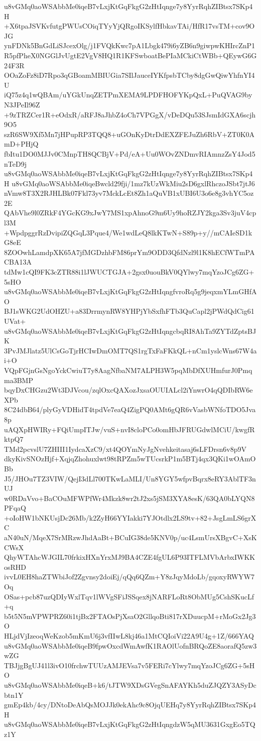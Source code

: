 u8vGMq0aoWSAbbMe0iqeB7vLxjKtGqFkgG2zHtIqnge7y8YyrRqhZIBtsx7SKp4H
+X6tpaJSVKvfutgPWUsCOiqTYyYjQRgoIKSylfHbkavTAi/HfR17vsTM+cov9OJG
ynFDNk5BnGdLiSJcexOlg/j1FVQkKwc7pA1Lbgk479i6yZB6n9giwpwKHIrcZnP1
R5pfPheX0NGGlJvUgtE2VgV8HQ1R1KFSwboatBePIaMCkiCtWBb+QEywG6G24F3R
OOaZoFz8iD7Rpo3qGBoamMBIUGia7SIlJauceIYKfpsbTCby8dgGwQiwYhfnYI4U
iQ75z4q1wQBAm/uYGkUnqZETPmXEMA9LPDFHOFYKpQxL+PuQVAG9byN3JPeIl96Z
+9zTRZCer1R+eOdxR/aRFJ8aJhbZ4oCh7VPGgX/vDeDQu53SJsmIdGXA6scjh9O5
szR6SW9Xf5Mn7jHPupRP3TQQ8+uGOnKyDtrDdEXZFEJuZh6RbV+ZT0K0AmD+PHjQ
fbItu1DO0MJJv0CMnpTH8QCBjV+Pd/eA+Uu0WOvZNDmvRIAmnzZsY4Jod5nTeD9j
u8vGMq0aoWSAbbMe0iqeB7vLxjKtGqFkgG2zHtIqnge7y8YyrRqhZIBtsx7SKp4H
u8vGMq0aoWSAbbMe0iqeBwcld29fji/1mz7kUzWkMiu2sD6gxlRhczoJSbt7jtJ6
nVmw8T3X2RJHLBk07Fkl73yv7MckLcEt8Zh1aQuVB1xUBI6U3o6e8g3vhYC5oz2E
QAbVhe9l0ZRkF4YGcKG9xJwY7MS1xpAhnoG9m6Uy9hoRZJY2kga3Sv3juV4cpl3M
+WpdpggrRzDvipiZQGqL3Pque4/We1wdLeQ8lkKTwN+S89p+y//mCAIeSD1kG8eE
8ZOOwhLamdpXK65A7jfMGDzhbFM86prYm9ODD3QfdNzl9l1K8hECfWTmPACBA13A
tdMw1cQI9FK3cZTR88i1lJWUCTGJA+2gsx0uouBkV0QYlwy7mqYzoJCg6ZG+5sHO
u8vGMq0aoWSAbbMe0iqeB7vLxjKtGqFkgG2zHtIqngfvroRq5g9jeqxmYLmGHfAO
BJ1sWKG2UdOHZU+a83DrrmynRW8YHPjYbSxfhFTb3QuCapl2jPWdQdCig61UVat+
u8vGMq0aoWSAbbMe0iqeB7vLxjKtGqFkgG2zHtIqngcbqRI8AhTa9ZYTdZptsBJK
3PvJMJlatz5UlCsGoTjrHCIwDmOMT7QS1rgTxFaFKkQL+nCm1yslcWns67W4ai+O
VQpFGjnGsNgoYckCwiuT7y8AagNfbaNM7ALPH3W5pqMbDfXUHmfurJ0Pmqma3BMP
bqyDxCHGzu2Wt3DJVcou/zqlOxcQAXozJxsaOUUIALcl2iYnwrO4qQDIbRW6eXPb
8C24dbB64/plyGyVDHidT4tpdVe7eaQ4ZigPQ0AMt6gQR6vVasbWNfoTDO5Jva8p
uAQXpHWIRy+FQiUmpITJw/vuS+nvI8cloPCo0omHbJFRUGdwlMCiU/kwgfRktpQ7
TMd2pcvslU7ZHIII1IydcaXzC9/xt4QOYmNyJgNvehkeitasaj6sLFDrsn6v8p9V
dkyKivSNOzHjf+XqjqZhohuxlwt98tRPZm5wTUcsrkP1m5BTj4qx3QKi1wOAmOBb
J5/JHOu7TZ3VIW/QejI3dLl700TKwLaMLI/Un8YGY5wfpvBqrx8eRY3AblTF3nUJ
w0RDaVvo+BaCOuMFWPfWr4Mkzk8wr2tJ2xs5jSM3XYA8esK/63QA0bLYQN8PFqaQ
+oIoHW1bNKUsjDc26Mb/k2ZyH66YYIakki7YJOtdlx2LS9tv+82+JsgLmLS6grXC
aN40uN/MqeX7SrMRzwJhdAaBt+BCuIG38de5KNV0p/uc4LsmUrsXBgvC+XsKCWsX
QhyWTAhcWJGIL70frkixHXnYrxMJ9BA4CZE4fgUL6P93ITFLMVbArbxIWKKosRHD
ivvL0EH8haZTWbiJof2Zgvnsy2doiEj/qQq6QZm+Y8zJqyMdoLb/gqoxyRWYW7Oq
OSas+pcb87uzQDIyWxlTqv1lWVgSFiJSSqex8jNARFLoRt8ObMUg5CshSKucLf+q
b5t5N5mVPWPRZ60i1tjBx2FTAOsPjXsaO2GllqoBti817rXDuucpM+rMoGx2Jg3O
HLjdVjIzeoqWeKzob5mKmU6j3vfIIwL8kj46a1MtCQIoiVi22A9U4g+1Z/666YAQ
u8vGMq0aoWSAbbMe0iqeB9fpwOxcdWmAwfK1RAOlUofnBRQoZE8aorafQ5zw3wZG
TBJjgBgUJ41l3ivO10frchwTUUzAMJEVsa7v5FERi7cYlwy7mqYzoJCg6ZG+5sHO
u8vGMq0aoWSAbbMe0iqeB+k6/tJTW9XDsGVegSnAFAYKh5duZJQZY3ASyDcbtn1Y
gmEp4kb/4cy/DNtoDeAbQsMOJJk0ekAhc9c8OjqUEHq7y8YyrRqhZIBtsx7SKp4H
u8vGMq0aoWSAbbMe0iqeB7vLxjKtGqFkgG2zHtIqngdzW5qMU3631GxgEo5TQz1Y

